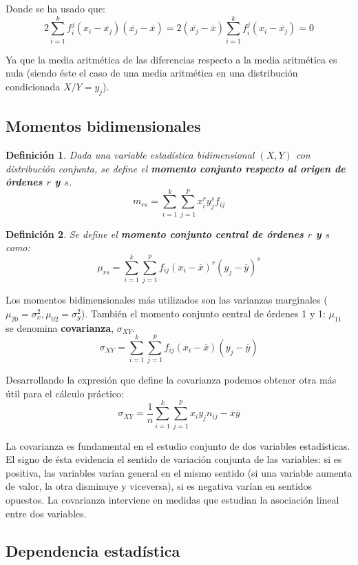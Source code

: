 \documentclass[10pt, a4paper]{article}
\theoremstyle{theorem-style}
\theoremstyle{definition-style}
\newtheorem{ndef}{Definición}[section]
\theoremstyle{remark-style}
\theoremstyle{example-style}
\theoremstyle{definition-style}
\theoremstyle{remark-style}
\begin{document}
Donde se ha usado que:
$$ 2\sum_{i=1}^k f_i^j (x_i -
\overline{x_j}){(\overline{x_j}-\overline{x})} =
2(\overline{x_j}-\overline{x})\sum_{i=1}^k f_i^j(x_i - \overline{x_j}) = 0 $$

Ya que la media aritmética de las diferencias respecto a la media aritmética es
nula (siendo éste el caso de una media aritmética en una distribución
condicionada $X/Y=y_j$).

\pagebreak

\subsection{Momentos bidimensionales}

\begin{ndef}
Dada una variable estadística bidimensional $(X,Y)$ con distribución conjunta, se
define el \textbf{momento conjunto respecto al origen de órdenes $r$ y $s$}.
$$ m_{rs} = \sum_{i=1}^k \sum_{j=1}^p x_i^r y_j^s f_{ij}$$
\end{ndef}

\begin{ndef}
Se define el \textbf{momento conjunto central de órdenes $r$ y $s$} como:
	$$
	\mu_{rs} = \sum_{i=1}^k \sum_{j=1}^p f_{ij}
			{(x_i - \overline{x})}^r {(y_j - \overline{y})}^s
	$$
\end{ndef}

	Los momentos bidimensionales más utilizados son las varianzas marginales
	{($\mu_{20}=\sigma_x^2, \mu_{02}=\sigma_y^2$)}. También el momento conjunto
	central de órdenes 1 y 1: $\mu_{11}$ se denomina \textbf{covarianza}, $\sigma_{XY}$.
	$$\sigma_{XY} = \sum_{i=1}^k \sum_{j=1}^p f_{ij} {(x_i - \overline{x} )}( y_j -
	\overline{y} )$$

	Desarrollando la expresión que define la covarianza podemos obtener otra más
	útil para el cálculo práctico:  $$ \sigma_{XY} = \frac{1}{n} \sum_{i=1}^k \sum_{j=1}^p x_i
	y_j n_{ij} - \overline{x} \overline{y} $$

	La covarianza es fundamental en el estudio conjunto de dos variables
	estadísticas. El signo de ésta evidencia el sentido de variación conjunta de
	las variables: si es positiva, las variables varían general en el mismo
	sentido (si una variable aumenta de valor, la otra disminuye y viceversa), si
	es negativa varían en sentidos opuestos. La covarianza interviene en medidas
	que estudian la asociación lineal entre dos variables.

\pagebreak

\subsection{Dependencia estadística}
\end{document}

